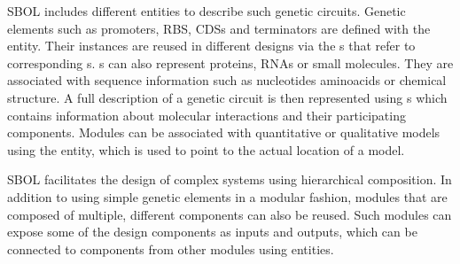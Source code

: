 SBOL includes different entities to describe such genetic circuits. Genetic elements such as promoters, RBS, CDSs and terminators are defined with the  entity. Their instances are reused in different designs via the s that refer to corresponding s. s can also represent proteins, RNAs or small molecules. They are associated with sequence information such as nucleotides aminoacids or chemical structure. A full description of a genetic circuit is then represented using  s which contains information about molecular interactions and their participating components. Modules can be associated with quantitative or qualitative models using the  entity, which is used to point to the actual location of a model.


SBOL facilitates the design of complex systems using hierarchical composition. In addition to using simple genetic elements in a modular fashion, modules that are composed of multiple, different components can also be reused. Such modules can expose some of the design components as inputs and outputs, which can be connected to components from other modules using  entities.


